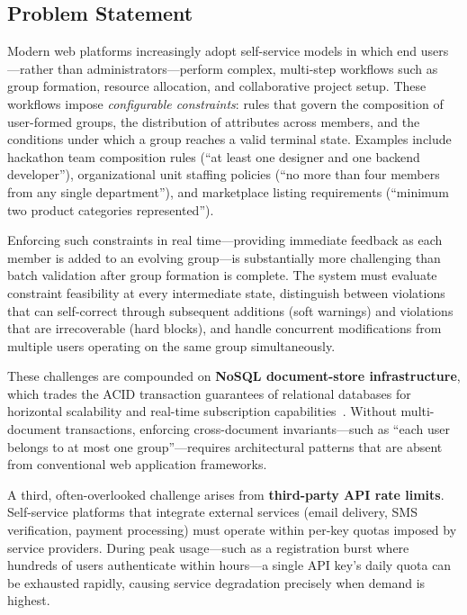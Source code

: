 \documentclass[11pt,a4paper]{article}
\theoremstyle{plain}
\theoremstyle{definition}
\begin{document}
\subsection{Problem Statement}

Modern web platforms increasingly adopt self-service models in which end users---rather than administrators---perform complex, multi-step workflows such as group formation, resource allocation, and collaborative project setup. These workflows impose \emph{configurable constraints}: rules that govern the composition of user-formed groups, the distribution of attributes across members, and the conditions under which a group reaches a valid terminal state. Examples include hackathon team composition rules (``at least one designer and one backend developer''), organizational unit staffing policies (``no more than four members from any single department''), and marketplace listing requirements (``minimum two product categories represented'').

Enforcing such constraints in real time---providing immediate feedback as each member is added to an evolving group---is substantially more challenging than batch validation after group formation is complete. The system must evaluate constraint feasibility at every intermediate state, distinguish between violations that can self-correct through subsequent additions (soft warnings) and violations that are irrecoverable (hard blocks), and handle concurrent modifications from multiple users operating on the same group simultaneously.

These challenges are compounded on \textbf{NoSQL document-store infrastructure}, which trades the ACID transaction guarantees of relational databases for horizontal scalability and real-time subscription capabilities~\cite{cattell2010, vogels2009}. Without multi-document transactions, enforcing cross-document invariants---such as ``each user belongs to at most one group''---requires architectural patterns that are absent from conventional web application frameworks.

A third, often-overlooked challenge arises from \textbf{third-party API rate limits}. Self-service platforms that integrate external services (email delivery, SMS verification, payment processing) must operate within per-key quotas imposed by service providers. During peak usage---such as a registration burst where hundreds of users authenticate within hours---a single API key's daily quota can be exhausted rapidly, causing service degradation precisely when demand is highest.
\end{document}
